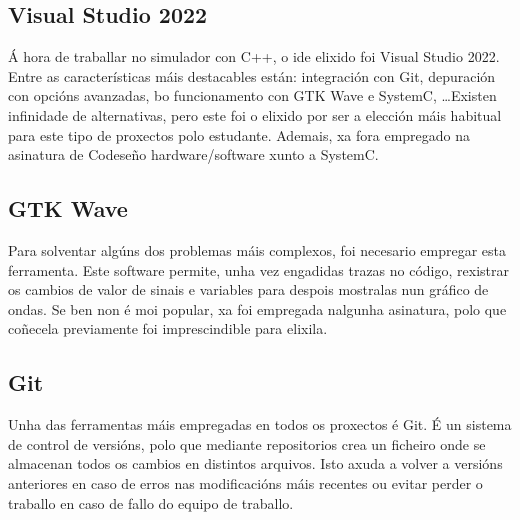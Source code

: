 \subsection{Visual Studio 2022}\label{sec:visual_studio}
Á hora de traballar no simulador con C++, o \acrshort{ide} elixido foi Visual Studio 2022. Entre as características máis destacables están: integración con Git, depuración con opcións avanzadas, bo funcionamento con GTK Wave e SystemC, \dots  Existen infinidade de alternativas, pero este foi o elixido por ser a elección máis habitual para este tipo de proxectos polo estudante. Ademais, xa fora empregado na asinatura de Codeseño \gls{hardware}/\gls{software} xunto a SystemC. 

\subsection{GTK Wave}\label{sec:gtkwave}
Para solventar algúns dos problemas máis complexos, foi necesario empregar esta ferramenta. Este software permite, unha vez engadidas trazas no código, rexistrar os cambios de valor de sinais e variables para despois mostralas nun gráfico de ondas. Se ben non é moi popular, xa foi empregada nalgunha asinatura, polo que  coñecela previamente foi imprescindible para elixila.

\subsection{Git}\label{sec:git}
Unha das ferramentas máis empregadas en todos os proxectos é Git. É un sistema de control de versións, polo que mediante repositorios crea un ficheiro onde se almacenan todos os cambios en distintos arquivos. Isto axuda a volver a versións anteriores en caso de erros nas modificacións máis recentes ou evitar perder o traballo en caso de fallo do equipo de traballo.


